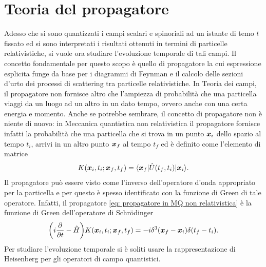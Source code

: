 \chapter{Teoria del propagatore}
Adesso che si sono quantizzati i campi scalari e spinoriali ad un istante di temo $t$ fissato ed si sono interpretati i risultati ottenuti in termini di particelle relativistiche, si vuole ora studiare l'evoluzione temporale di tali campi. Il concetto fondamentale per questo scopo è quello di propagatore la cui espressione esplicita funge da base per i diagrammi di Feynman e il calcolo delle sezioni d'urto dei processi di scattering tra particelle relativistiche. In Teoria dei campi, il propagatore non fornisce altro che l'ampiezza di probabilità che una particella viaggi da un luogo ad un altro in un dato tempo, ovvero anche con una certa energia e momento. Anche se potrebbe sembrare, il concetto di propagatore non è niente di nuovo: in Meccanica quantistica non relativistica il propagatore fornisce infatti la probabilità che una particella che si trova in un punto $\bm{x}_i$ dello spazio al tempo $t_i$, arrivi in un altro punto $\bm{x}_f$ al tempo $t_f$ ed è definito come l'elemento di matrice 
\begin{equation}
\label{eq: propagatore in MQ non relativistica}
    K(\bm{x}_i,t_i;\bm{x}_f,t_f) = \langle \bm{x}_f | \hat{U}(t_f,t_i) | \bm{x}_i \rangle.
\end{equation}
Il propagatore può essere visto come l'inverso dell'operatore d'onda appropriato per la particella e per questo è spesso identificato con la funzione di Green di tale operatore. Infatti, il propagatore \eqref{eq: propagatore in MQ non relativistica} è la funzione di Green dell'operatore di Schr\"odinger 
\begin{equation}
    \bigg(i\frac{\partial}{\partial t} - \hat{H}\bigg)K(\bm{x}_i,t_i;\bm{x}_f,t_f) = -i\delta^3(\bm{x}_f - \bm{x}_i)\delta(t_f - t_i).
\end{equation}
Per studiare l'evoluzione temporale si è soliti usare la rappresentazione di Heisenberg per gli operatori di campo quantistici.

